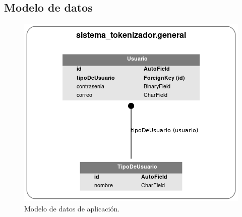 %
%

\subsection{Modelo de datos}

\begin{figure}
  \begin{center}
    \includegraphics[width=0.4\linewidth]{diagramas/modelo_de_datos.png}
    \caption{Modelo de datos de aplicación.}
    \label{figura:modelo_De_datos}
  \end{center}
\end{figure}
